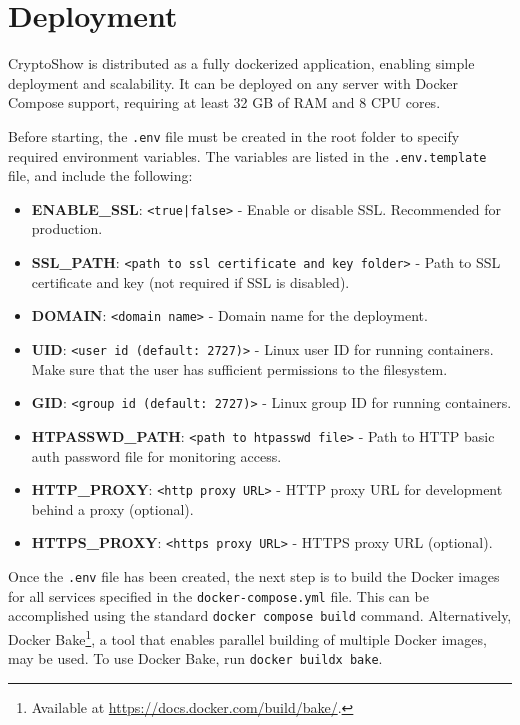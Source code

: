 \section{Deployment}
\label{sec:deployment}

CryptoShow is distributed as a fully dockerized application, enabling simple deployment and scalability. It can be deployed on any server with Docker Compose support, requiring at least 32 GB of RAM and 8 CPU cores.

Before starting, the \lstinline|.env| file must be created in the root folder to specify required environment variables. The variables are listed in the \lstinline|.env.template| file, and include the following:

\begin{itemize}
    \item \textbf{ENABLE\_SSL}: \texttt{<true|false>} - Enable or disable SSL. Recommended for production.
    \item \textbf{SSL\_PATH}: \texttt{<path to ssl certificate and key folder>} - Path to SSL certificate and key (not required if SSL is disabled).
    \item \textbf{DOMAIN}: \texttt{<domain name>} - Domain name for the deployment.
    \item \textbf{UID}: \texttt{<user id (default: 2727)>} - Linux user ID for running containers. Make sure that the user has sufficient permissions to the filesystem.
    \item \textbf{GID}: \texttt{<group id (default: 2727)>} - Linux group ID for running containers.
    \item \textbf{HTPASSWD\_PATH}: \texttt{<path to htpasswd file>} - Path to HTTP basic auth password file for monitoring access.
    \item \textbf{HTTP\_PROXY}: \texttt{<http proxy URL>} - HTTP proxy URL for development behind a proxy (optional).
    \item \textbf{HTTPS\_PROXY}: \texttt{<https proxy URL>} - HTTPS proxy URL (optional).
\end{itemize}

Once the \lstinline|.env| file has been created, the next step is to build the Docker images for all services specified in the \lstinline!docker-compose.yml! file. This can be accomplished using the standard \lstinline|docker compose build| command. Alternatively, Docker Bake\footnote{Available at \url{https://docs.docker.com/build/bake/}.}, a tool that enables parallel building of multiple Docker images, may be used. To use Docker Bake, run \lstinline|docker buildx bake|.

